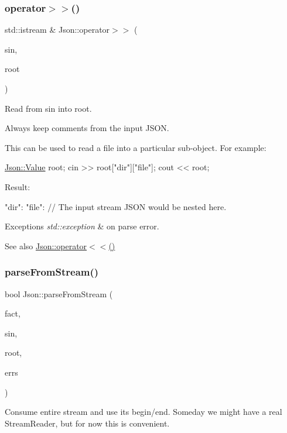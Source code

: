 \subsubsection{\texorpdfstring{operator$>$$>$()}{operator>>()}}
{\footnotesize\ttfamily std\+::istream \& Json\+::operator$>$$>$ (\begin{DoxyParamCaption}\item[{std\+::istream \&}]{sin,  }\item[{\hyperlink{class_json_1_1_value}{Value} \&}]{root }\end{DoxyParamCaption})}



Read from \textquotesingle{}sin\textquotesingle{} into \textquotesingle{}root\textquotesingle{}. 

Always keep comments from the input J\+S\+ON.

This can be used to read a file into a particular sub-\/object. For example\+: 
\begin{DoxyCode}
\hyperlink{class_json_1_1_value}{Json::Value} root;
cin >> root[\textcolor{stringliteral}{"dir"}][\textcolor{stringliteral}{"file"}];
cout << root;
\end{DoxyCode}
 Result\+: \begin{DoxyVerb}{
"dir": {
    "file": {
    // The input stream JSON would be nested here.
    }
}
}
\end{DoxyVerb}
 
\begin{DoxyExceptions}{Exceptions}
{\em std\+::exception} & on parse error. \\
\hline
\end{DoxyExceptions}
\begin{DoxySeeAlso}{See also}
\hyperlink{namespace_json_a87bc83d7e90fc666d28aa16727deda2f}{Json\+::operator$<$$<$()} 
\end{DoxySeeAlso}
\mbox{\label{namespace_json_acfebeaf759a841173ddce34c4da22486}} 
\subsubsection{\texorpdfstring{parse\+From\+Stream()}{parseFromStream()}}
{\footnotesize\ttfamily bool Json\+::parse\+From\+Stream (\begin{DoxyParamCaption}\item[{\hyperlink{class_json_1_1_char_reader_1_1_factory}{Char\+Reader\+::\+Factory} const \&}]{fact,  }\item[{std\+::istream \&}]{sin,  }\item[{\hyperlink{class_json_1_1_value}{Value} $\ast$}]{root,  }\item[{std\+::string $\ast$}]{errs }\end{DoxyParamCaption})}

Consume entire stream and use its begin/end. Someday we might have a real Stream\+Reader, but for now this is convenient. 